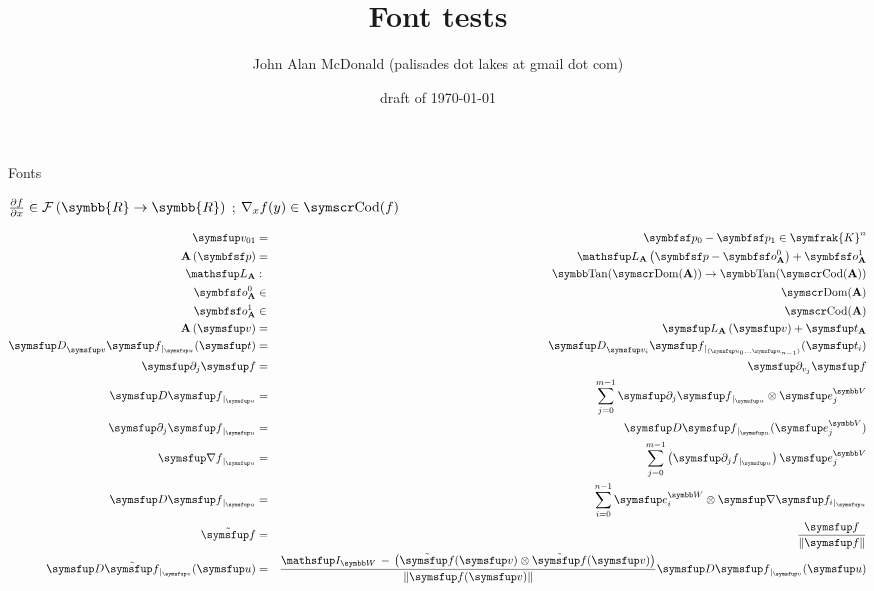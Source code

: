 \documentclass[12pt]{PalisadesLakesArticle}
\title{Font tests}
\author{John Alan McDonald 
(palisades dot lakes at gmail dot com)}
\date{draft of \today}
\begin{document}
\def\sharedFolder{../shared/}

\begin{plSection}{Fonts}

$
\frac{\partial f}{\partial x} 
\in \mathcal{F}\left(\symbb{R} \rightarrow \symbb{R}\right)$
;
$\nabla_{x} f (y) \in \codomain ( f )$

\begin{eqnarray}
\Vector{v_{01}} & = & \Point{p}_{0} - \Point{p}_{1} \in \symfrak{K}^n
\\
\Affine{A} \left( \Point{p} \right)
& = & 
\Linear{L}_{\Affine{A}} 
\left( 
\Point{p} - \Point{o}_{\Affine{A}}^{0}
 \right) 
+ 
\Point{o}_{\Affine{A}}^{1}
\\
\Linear{L}_{\Affine{A}} & : &\TangentSpace(\domain(\Affine{A}))
\rightarrow \TangentSpace(\codomain(\Affine{A}))
\\
\Point{o}_{\Affine{A}}^{0} & \in & \domain(\Affine{A})
\\
\Point{o}_{\Affine{A}}^{1} & \in & \codomain(\Affine{A})
\\
\Affine{A} \left( \Vector{v} \right)
& = & 
\Vector{L}_{\Affine{A}} \left( \Vector{v} \right)
+ \Vector{t}_{\Affine{A}} 
\\
\Derivative[\Vector{v}]{\Vector{f}}[\Vector{u}][\Vector{t}]
& = &
\Derivative[\Vector{v}_i]{\Vector{f}}
[(\Vector{u}_0 \ldots \Vector{u}_{n-1})][\Vector{t}_i] 
\\
\Partial{j}{\Vector{f}} & = &\Partial{v_j}{\Vector{f}} 
\\
\Derivative{\Vector{f}}[\Vector{u}]
& = &
\sum_{j=0}^{m-1} \Partial{j}{\Vector{f}}[\Vector{u}] 
\otimes \Vector{e}_j^{\Space{V}}
\\
\Partial{j}{\Vector{f}}[\Vector{u}]
& = &
\Derivative{\Vector{f}}[\Vector{u}] [\Vector{e}_j^{\Space{V}}]
\\
\Gradient{f}[\Vector{u}] 
& = &
\sum_{j=0}^{m-1} 
\left( 
\Partial{j}{f}[\Vector{u}] 
\right) \Vector{e}_j^{\Space{V}}
\\
\Derivative{\Vector{f}}[\Vector{u}]
& = &
 \sum_{i=0}^{n-1}  
\Vector{e}_i^{\Space{W}} 
\otimes \Gradient{\Vector{f}_i}[\Vector{u}]
\\
\tilde{\Vector{f}}  
& = &
\frac{\Vector{f}}{\| \Vector{f} \|}
\\
\Derivative{\tilde{\Vector{f}}}[\Vector{v}][\Vector{u}]
& = &
\frac{\Identity_{\Space{W}} 
\,-\, 
\left( 
\tilde{\Vector{f}}(\Vector{v})
 \otimes 
 \tilde{\Vector{f}}(\Vector{v}) \right)  
 }
{\| \Vector{f}(\Vector{v}) \|}
\Derivative{\Vector{f}}[\Vector{v}][\Vector{u}] 
\end{eqnarray}



\end{plSection}
\end{document}
